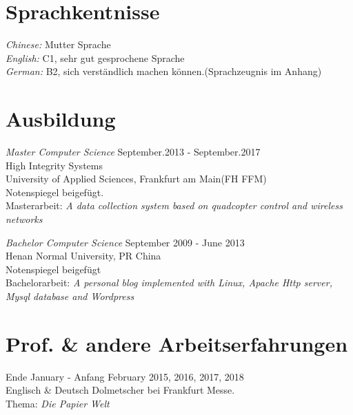 \documentclass[margin, 10pt]{res} %
\begin{document}
\begin{resume}
\section{Sprachkentnisse} 
{\sl Chinese:} 		Mutter Sprache\\
{\sl English:} 		C1, sehr gut gesprochene Sprache\\
{\sl German:} 		B2, sich verständlich machen können.(Sprachzeugnis im Anhang)
\section{Ausbildung}
{\sl Master Computer Science} \hfill  September.2013 - September.2017\\
High Integrity Systems \\ University of Applied Sciences, Frankfurt am Main(FH FFM)\\
Notenspiegel beigefügt.\\
Masterarbeit: \textit{A data collection system based on quadcopter control and wireless networks}

{\sl Bachelor Computer Science} \hfill September 2009 - June 2013 \\
Henan Normal University, PR China\\
Notenspiegel beigefügt\\
Bachelorarbeit: \textit{A personal blog implemented with Linux, Apache Http server, Mysql database and Wordpress}


\section{Prof. \& andere Arbeitserfahrungen} 

Ende January - Anfang February 2015, 2016, 2017, 2018\\
Englisch \& Deutsch Dolmetscher bei Frankfurt Messe.\\
Thema: \textit{Die Papier Welt} 


\end{resume}
\end{document}
